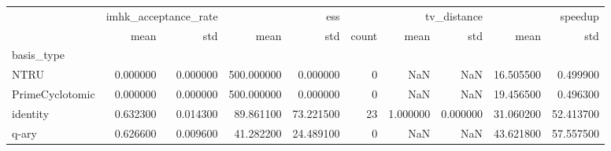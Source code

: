 \begin{tabular}{lrrrrrrrrr}
\toprule
 & \multicolumn{2}{r}{imhk_acceptance_rate} & \multicolumn{2}{r}{ess} & \multicolumn{3}{r}{tv_distance} & \multicolumn{2}{r}{speedup} \\
 & mean & std & mean & std & count & mean & std & mean & std \\
basis_type &  &  &  &  &  &  &  &  &  \\
\midrule
NTRU & 0.000000 & 0.000000 & 500.000000 & 0.000000 & 0 & NaN & NaN & 16.505500 & 0.499900 \\
PrimeCyclotomic & 0.000000 & 0.000000 & 500.000000 & 0.000000 & 0 & NaN & NaN & 19.456500 & 0.496300 \\
identity & 0.632300 & 0.014300 & 89.861100 & 73.221500 & 23 & 1.000000 & 0.000000 & 31.060200 & 52.413700 \\
q-ary & 0.626600 & 0.009600 & 41.282200 & 24.489100 & 0 & NaN & NaN & 43.621800 & 57.557500 \\
\bottomrule
\end{tabular}
